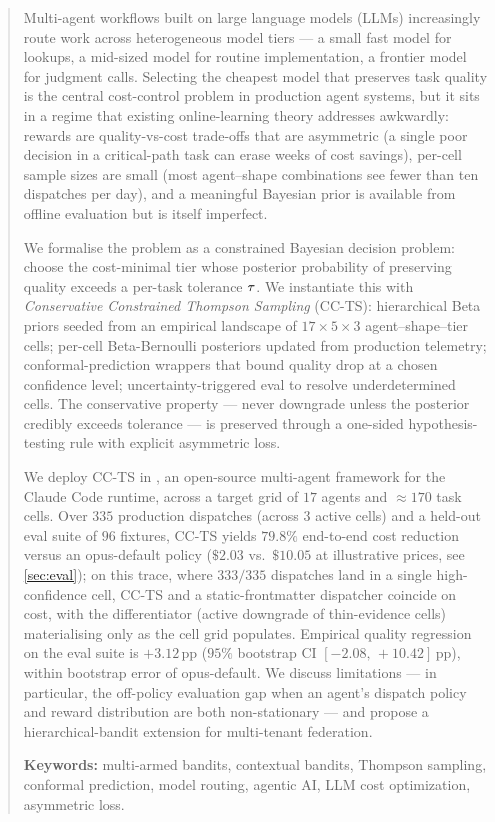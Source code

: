 \begin{abstract}
\noindent
Multi-agent workflows built on large language models (LLMs) increasingly route
work across heterogeneous model tiers --- a small fast model for lookups, a
mid-sized model for routine implementation, a frontier model for judgment
calls. Selecting the cheapest model that preserves task quality is the central
cost-control problem in production agent systems, but it sits in a regime that
existing online-learning theory addresses awkwardly: rewards are
quality-vs-cost trade-offs that are asymmetric (a single poor decision in a
critical-path task can erase weeks of cost savings), per-cell sample sizes are
small (most agent--shape combinations see fewer than ten dispatches per day),
and a meaningful Bayesian prior is available from offline evaluation but is
itself imperfect.

We formalise the problem as a constrained Bayesian decision problem: choose
the cost-minimal tier whose posterior probability of preserving quality
exceeds a per-task tolerance $\qtol$. We instantiate this with
\emph{Conservative Constrained Thompson Sampling} (CC-TS): hierarchical Beta
priors seeded from an empirical landscape of $17 \times 5 \times 3$
agent--shape--tier cells; per-cell Beta-Bernoulli posteriors updated from
production telemetry; conformal-prediction wrappers that bound quality drop
at a chosen confidence level; uncertainty-triggered eval to resolve
underdetermined cells. The conservative property --- never downgrade unless
the posterior credibly exceeds tolerance --- is preserved through a one-sided
hypothesis-testing rule with explicit asymmetric loss.

We deploy CC-TS in \blackrim, an open-source multi-agent framework
for the Claude Code runtime, across a target grid of $17$ agents and
$\approx{170}$ task cells. Over $335$ production dispatches (across $3$
active cells) and a held-out eval suite of $96$ fixtures, CC-TS yields
$79.8\%$ end-to-end cost reduction versus an opus-default policy
($\$2.03$ vs.\ $\$10.05$ at illustrative prices, see \cref{sec:eval});
on this trace, where $333/335$ dispatches land in a single high-confidence
cell, CC-TS and a static-frontmatter dispatcher coincide on cost, with
the differentiator (active downgrade of thin-evidence cells) materialising
only as the cell grid populates. Empirical quality regression on the
eval suite is $+3.12\,\mathrm{pp}$ ($95\%$ bootstrap CI
$[-2.08,\,+10.42]\,\mathrm{pp}$), within bootstrap error of opus-default. We discuss limitations --- in particular, the off-policy
evaluation gap when an agent's dispatch policy and reward distribution are
both non-stationary --- and propose a hierarchical-bandit extension for
multi-tenant federation.

\textbf{Keywords:} multi-armed bandits, contextual bandits, Thompson sampling,
conformal prediction, model routing, agentic AI, LLM cost optimization,
asymmetric loss.
\end{abstract}
